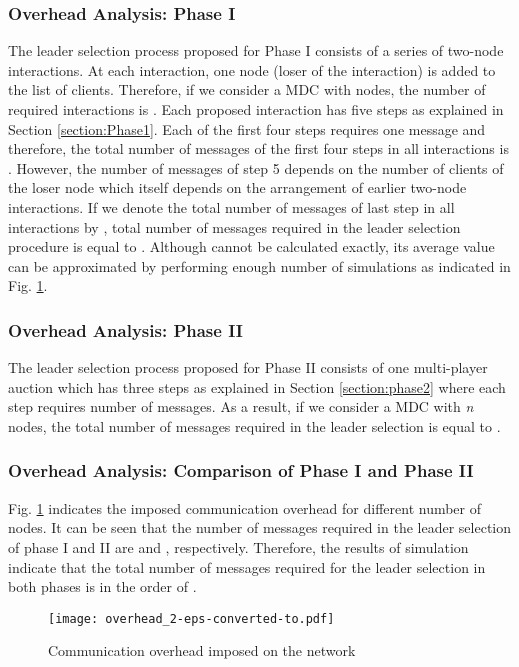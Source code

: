 \documentclass[journal,12pt, onecolumn]{IEEEtran}
\begin{document}
\subsubsection{Overhead Analysis: Phase I} \label{Performance Overhead_1}
The leader selection process proposed for Phase I consists of a series of two-node interactions. At each interaction, one node (loser of the interaction) is added to the list of clients. Therefore, if we consider a MDC with  nodes, the number of required interactions is . Each proposed interaction has five steps as explained in Section \ref{section:Phase1}. 
Each of the first four steps requires one message and therefore, the total number of messages of the first four steps in all  interactions is . However, the number of messages of step 5 depends on the number of clients of the loser node which itself depends on the arrangement of earlier two-node interactions. If we denote the total number of messages of last step in all  interactions by , total number of messages required in the leader selection procedure is equal to . Although  cannot be calculated exactly, its average value can be approximated by performing enough number of simulations as indicated in Fig. \ref{figure 10}.

\subsubsection{Overhead Analysis: Phase II}
The leader selection process proposed for Phase II consists of one multi-player auction which has three steps as explained in Section \ref{section:phase2} where each step requires  number of messages. As a result, if we consider a MDC with \textit{n} nodes, the total number of messages required in the leader selection is equal to .
\subsubsection{Overhead Analysis: Comparison of Phase I and Phase II}
Fig. \ref{figure 10} indicates the imposed communication overhead for different number of nodes. It can be seen that the number of messages required in the leader selection of phase I and II are  and , respectively. Therefore, the results of simulation indicate that the total number of messages required for the leader selection in both phases is in the order of .

\begin{figure}
\centering
      \texttt{[image: overhead\_2-eps-converted-to.pdf]}
      \caption{Communication overhead imposed on the network}
\label{figure 10}
\end{figure}
\end{document}
